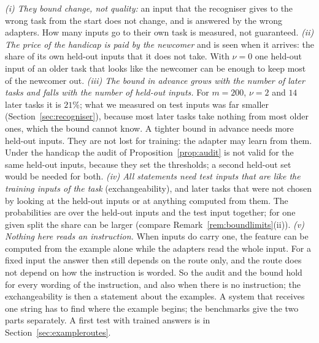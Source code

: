 \begin{remark}
\label{rem:auditlimits}
\emph{(i) They bound change, not quality:} an input that the
recogniser gives to the wrong task from the start does not change, and is answered by the wrong
adapters. How many inputs go to their own task is measured, not guaranteed.
\emph{(ii) The price of the handicap is paid by the newcomer} and is seen when it arrives: the
share of its own held-out inputs that it does not take. With $\nu = 0$ one held-out input of an
older task that looks like the newcomer can be enough to keep most of the newcomer out.
\emph{(iii) The bound in advance grows with the number of later tasks and falls with the number of
held-out inputs.} For $m = 200$, $\nu = 2$ and $14$ later tasks it is $21\%$; what we measured on
test inputs was far smaller (Section~\ref{sec:recogniser}), because most later tasks take nothing
from most older ones, which the bound cannot know. A tighter bound in advance needs more held-out
inputs. They are not lost for training: the adapter may learn from them. Under the handicap the
audit of Proposition~\ref{prop:audit} is not valid for the same held-out inputs, because they set
the thresholds; a second held-out set would be needed for both.
\emph{(iv) All statements need test inputs that are like the training inputs of the task}
(exchangeability), and later tasks that were not chosen by looking at the held-out inputs or at
anything computed from them. The probabilities are over the held-out inputs and the test input
together; for one given split the share can be larger (compare
Remark~\ref{rem:boundlimits}(ii)).
\emph{(v) Nothing here reads an instruction.} When inputs do carry one, the feature can be computed
from the example alone while the adapters read the whole input. For a fixed input the answer then
still depends on the route only, and the route does not depend on how the instruction is worded.
So the audit and the bound hold for every wording of the instruction, and also when there is no instruction; the
exchangeability is then a statement about the examples. A system that receives one string has to
find where the example begins; the benchmarks give the two parts separately. A first test with trained answers is in Section~\ref{sec:exampleroutes}.
\end{remark}
